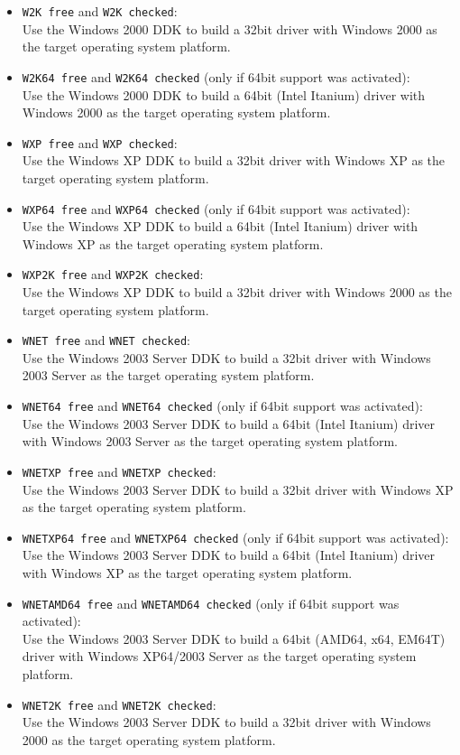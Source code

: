 \documentclass[a4paper,titlepage]{report}
\newcommand{\solcfg}[2]{\texttt{#1 free} and \texttt{#1 checked}:\\#2}
\newcommand{\solcfgsixfour}[2]{\texttt{#1 free} and \texttt{#1 checked} \textcolor[gray]{0.40}{\textsf{\small(only if 64bit support was activated)}}:\\#2}
\begin{document}
\begin{itemize}
  \item \solcfg{W2K}{Use the Windows 2000 DDK to build a 32bit driver with Windows 2000 as the target operating system platform.}
  \item \solcfgsixfour{W2K64}{Use the Windows 2000 DDK to build a 64bit (Intel Itanium) driver with Windows 2000 as the target operating system platform.}

  \item \solcfg{WXP}{Use the Windows XP DDK to build a 32bit driver with Windows XP as the target operating system platform.}
  \item \solcfgsixfour{WXP64}{Use the Windows XP DDK to build a 64bit (Intel Itanium) driver with Windows XP as the target operating system platform.}
  \item \solcfg{WXP2K}{Use the Windows XP DDK to build a 32bit driver with Windows 2000 as the target operating system platform.}

  \item \solcfg{WNET}{Use the Windows 2003 Server DDK to build a 32bit driver with Windows 2003 Server as the target operating system platform.}
  \item \solcfgsixfour{WNET64}{Use the Windows 2003 Server DDK to build a 64bit (Intel Itanium) driver with Windows 2003 Server as the target operating system platform.}
  \item \solcfg{WNETXP}{Use the Windows 2003 Server DDK to build a 32bit driver with Windows XP as the target operating system platform.}
  \item \solcfgsixfour{WNETXP64}{Use the Windows 2003 Server DDK to build a 64bit (Intel Itanium) driver with Windows XP as the target operating system platform.}
  \item \solcfgsixfour{WNETAMD64}{Use the Windows 2003 Server DDK to build a 64bit (AMD64, x64, EM64T) driver with Windows XP64/2003 Server as the target operating system platform.}
  \item \solcfg{WNET2K}{Use the Windows 2003 Server DDK to build a 32bit driver with Windows 2000 as the target operating system platform.}


\end{itemize}
\end{document}
